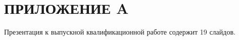 \chapter*{\label{add1}ПРИЛОЖЕНИЕ A}

Презентация к выпускной квалификационной работе содержит 19 слайдов.
